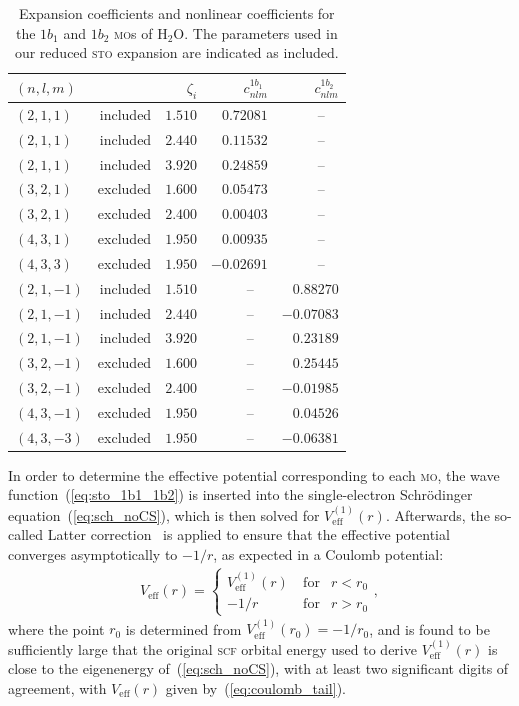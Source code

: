 \begin{table}[t]
 \centering
  \caption{\label{tab:1b11b2_coef} Expansion coefficients and
    nonlinear coefficients for the $1b_{1}$ and $1b_{2}$ \textsc{mo}s
    of H$_{2}$O. The parameters used in our reduced \textsc{sto}
    expansion are indicated as included.}
  \begin{tabular}{lrrrr}
    \toprule
    $(n,l, m)$ & & $\zeta_{i}$ & $c_{nlm}^{1b_{1}}$ & $c_{nlm}^{1b_{2}}$ \\
    \midrule
    $(2,1,1)$ & included & $1.510$ & $0.72081$ & --~~ \\
    $(2,1,1)$ & included & $2.440$ & $0.11532$ & --~~ \\
    $(2,1,1)$ & included & $3.920$ & $0.24859$ & --~~ \\
    $(3,2,1)$ & excluded & $1.600$ & $0.05473$ & --~~ \\
    $(3,2,1)$ & excluded & $2.400$ & $0.00403$ & --~~ \\
    $(4,3,1)$ & excluded & $1.950$ & $0.00935$ & --~~ \\
    $(4,3,3)$ & excluded & $1.950$ & $-0.02691$ & --~~ \\
    $(2,1,-1)$ & included & $1.510$ & --~~ & $0.88270$ \\
    $(2,1,-1)$ & included & $2.440$ & --~~ & $-0.07083$ \\
    $(2,1,-1)$ & included & $3.920$ & --~~ & $0.23189$ \\
    $(3,2,-1)$ & excluded & $1.600$ & --~~ & $0.25445$ \\
    $(3,2,-1)$ & excluded & $2.400$ & --~~ & $-0.01985$ \\
    $(4,3,-1)$ & excluded & $1.950$ & --~~ & $0.04526$ \\
    $(4,3,-3)$ & excluded & $1.950$ & --~~ & $-0.06381$ \\
    \bottomrule
  \end{tabular}
\end{table}

In order to determine the effective potential corresponding to each
\textsc{mo}, the wave function~(\ref{eq:sto_1b1_1b2}) is inserted
into the single-electron Schr\"{o}dinger equation~(\ref{eq:sch_noCS}),
which is then solved for $V_{\mathrm{eff}}^{(1)}(r)$. Afterwards, the
so-called Latter correction~\cite{LatterCor_1955,sarias_2016} is
applied to ensure that the effective potential converges
asymptotically to $-1/r$, as expected in a Coulomb potential:
%
\begin{eqnarray}
V_{\mathrm{eff}}(r) = \left\{
\begin{split}
V_{\mathrm{eff}}^{(1)}(r)\  & \mathrm{for} & r < r_{0} \\
-1/r\  & \mathrm{for} & r > r_{0}
\end{split}
\right.
,
\label{eq:coulomb_tail}
\end{eqnarray}
%
where the point $r_{0}$ is determined from
$V_{\mathrm{eff}}^{(1)}(r_{0}) = -1/r_{0}$, and is found to be
sufficiently large that the original \textsc{scf} orbital energy used
to derive $V_{\mathrm{eff}}^{(1)}(r)$ is close to the eigenenergy
of~(\ref{eq:sch_noCS}), with at least two significant digits of
agreement, with $V_{\mathrm{eff}}(r)$ given
by~(\ref{eq:coulomb_tail}).


